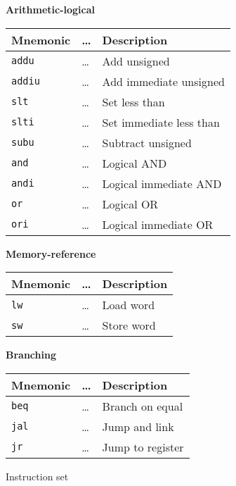 \documentclass[11pt,twoside,a4paper]{article}
\begin{document}
\begin{figure}[H]
	\begin{multicols}{2}
	\center

	\textbf{Arithmetic-logical} \\
	\vspace{0.15in}
	\begin{tabular}{|l|l|l|}
		\hline
		\scriptsize {\bf Mnemonic} &
		\scriptsize {\bf \dots} &
		\scriptsize {\bf Description} \\
		\hline {\tt addu} & \dots & \scriptsize Add unsigned \\
		\hline {\tt addiu} & \dots & \scriptsize Add immediate unsigned \\
		\hline {\tt slt} & \dots & \scriptsize Set less than \\
		\hline {\tt slti} & \dots & \scriptsize Set immediate less than \\
		\hline {\tt subu} & \dots & \scriptsize Subtract unsigned \\
		\hline {\tt and} & \dots & \scriptsize Logical AND \\
		\hline {\tt andi} & \dots & \scriptsize Logical immediate AND \\
		\hline {\tt or} & \dots & \scriptsize Logical OR \\
		\hline {\tt ori} & \dots & \scriptsize Logical immediate OR \\
		\hline
	\end{tabular}
	
	\columnbreak
	\center

	\textbf{Memory-reference} \\
	\vspace{0.15in}
	\begin{tabular}{|l|l|l|}
		\hline
		\scriptsize {\bf Mnemonic} &
		\scriptsize {\bf \dots} &
		\scriptsize {\bf Description} \\
		\hline {\tt lw} & \dots & \scriptsize Load word \\
		\hline {\tt sw} & \dots & \scriptsize Store word \\
		\hline
	\end{tabular}

	\vspace{0.26in}
	\textbf{Branching} \\
	\vspace{0.15in}
	\begin{tabular}{|l|l|l|}
		\hline
		\scriptsize {\bf Mnemonic} &
		\scriptsize {\bf \dots} &
		\scriptsize {\bf Description} \\
		\hline {\tt beq} & \dots & \scriptsize Branch on equal \\
		\hline {\tt jal} & \dots & \scriptsize Jump and link \\
		\hline {\tt jr} & \dots & \scriptsize Jump to register \\
		\hline
	\end{tabular}

	\end{multicols}
	\caption{Instruction set}
	\label{fig:instruction-set}
\end{figure}
\end{document}
